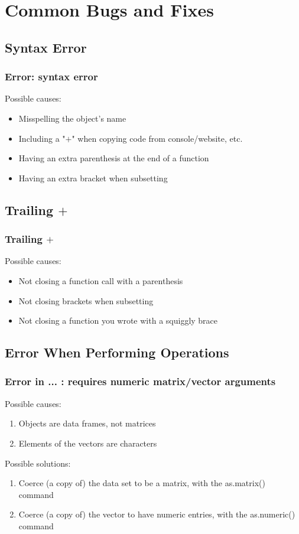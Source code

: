 \section{Common Bugs and Fixes}

\subsection{Syntax Error}
\begin{frame}[fragile]
  \frametitle{\ttfamily Error: syntax error \normalfont}
Possible causes:
  \begin{itemize}
    \item Misspelling the object's name
    \item Including a "$+$" when copying code from console/website, etc.
    \item Having an extra parenthesis at the end of a function
    \item Having an extra bracket when subsetting
  \end{itemize}
\end{frame}

\subsection{Trailing $+$}
\begin{frame}[fragile]
  \frametitle{Trailing $+$}
Possible causes:
  \begin{itemize}
    \item Not closing a function call with a parenthesis
    \item Not closing brackets when subsetting
    \item Not closing a function you wrote with a squiggly brace
  \end{itemize}
\end{frame}

\subsection{Error When Performing Operations}
\begin{frame}[fragile]
  \frametitle{\ttfamily Error in ... : requires numeric matrix/vector arguments \normalfont}
Possible causes:
  \begin{enumerate}
    \item Objects are data frames, not matrices
    \item Elements of the vectors are characters \\
  \end{enumerate}
  
Possible solutions:
  \begin{enumerate}
    \item Coerce (a copy of) the data set to be a matrix, with the \ttfamily as.matrix() \normalfont command
    \item Coerce (a copy of) the vector to have numeric entries, with the \ttfamily as.numeric() \normalfont command
  \end{enumerate} 
\end{frame}

